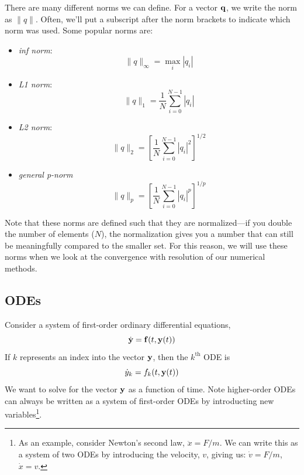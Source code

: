 There are many different norms we can define.  For a vector ${\bf q}$,
we write the norm as $\|q\|$.  Often, we'll put a subscript after the
norm brackets to indicate which norm was used.  Some popular norms
are:
\begin{itemize}
\item {\em inf norm}: 
  \begin{equation} 
    \| q \|_\infty = \max_i |q_i|
  \end{equation}

\item {\em L1 norm}:
  \begin{equation}
    \| q \|_1 = \frac{1}{N} \sum_{i=0}^{N-1} |q_i|
  \end{equation}

\item {\em L2 norm}:
  \begin{equation}
    \| q \|_2 = \left [ \frac{1}{N} \sum_{i=0}^{N-1} |q_i|^2 \right ]^{1/2}
  \end{equation}

\item {\em general p-norm}
  \begin{equation}
    \| q \|_p = \left [ \frac{1}{N} \sum_{i=0}^{N-1} |q_i|^p \right ]^{1/p}
  \end{equation}

\end{itemize}

Note that these norms are defined such that they are normalized---if
you double the number of elements ($N$), the normalization gives you a
number that can still be meaningfully compared to the smaller set.
For this reason, we will use these norms when we look at the
convergence with resolution of our numerical methods.



\subsection{ODEs}

Consider a system of first-order ordinary differential equations,
\begin{equation}
\dot{\bf y} = {\bf f}(t, {\bf y}(t))
\end{equation}
If $k$ represents an index into the vector ${\bf y}$, then the
$k^\mathrm{th}$ ODE is
\begin{equation}
\dot{y}_k = f_k(t, {\bf y}(t))
\end{equation}
We want to solve for the vector ${\bf y}$ as a function of time.  Note
higher-order ODEs can always be written as a system of first-order
ODEs by introducting new variables\footnote{As an example, consider
  Newton's second law, $\ddot{x} = F/m$.  We can write this as a system
  of two ODEs by introducing the velocity, $v$, giving us: $\dot{v} =
  F/m$, $\dot{x} = v$.}.

